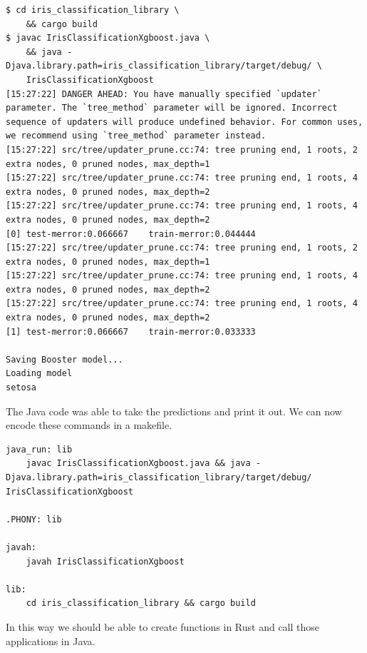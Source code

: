 \documentclass{book}
\begin{document}
\begin{lstlisting}[caption={chapter8/iris\_classification\_xgboost/iris\_classification\_library/src/lib.rs}, basicstyle=\small]
$ cd iris_classification_library \
	&& cargo build
$ javac IrisClassificationXgboost.java \
	&& java -Djava.library.path=iris_classification_library/target/debug/ \
	IrisClassificationXgboost
[15:27:22] DANGER AHEAD: You have manually specified `updater` parameter. The `tree_method` parameter will be ignored. Incorrect sequence of updaters will produce undefined behavior. For common uses, we recommend using `tree_method` parameter instead.
[15:27:22] src/tree/updater_prune.cc:74: tree pruning end, 1 roots, 2 extra nodes, 0 pruned nodes, max_depth=1
[15:27:22] src/tree/updater_prune.cc:74: tree pruning end, 1 roots, 4 extra nodes, 0 pruned nodes, max_depth=2
[15:27:22] src/tree/updater_prune.cc:74: tree pruning end, 1 roots, 4 extra nodes, 0 pruned nodes, max_depth=2
[0]	test-merror:0.066667	train-merror:0.044444
[15:27:22] src/tree/updater_prune.cc:74: tree pruning end, 1 roots, 2 extra nodes, 0 pruned nodes, max_depth=1
[15:27:22] src/tree/updater_prune.cc:74: tree pruning end, 1 roots, 4 extra nodes, 0 pruned nodes, max_depth=2
[15:27:22] src/tree/updater_prune.cc:74: tree pruning end, 1 roots, 4 extra nodes, 0 pruned nodes, max_depth=2
[1]	test-merror:0.066667	train-merror:0.033333

Saving Booster model...
Loading model
setosa
\end{lstlisting}

The Java code was able to take the predictions and print it out. We can now encode these commands in a makefile.

\begin{lstlisting}[caption={chapter8/iris\_classification\_xgboost/Makefile}, basicstyle=\small]
java_run: lib
	javac IrisClassificationXgboost.java && java -Djava.library.path=iris_classification_library/target/debug/ IrisClassificationXgboost

.PHONY: lib

javah:
	javah IrisClassificationXgboost

lib:
	cd iris_classification_library && cargo build
\end{lstlisting}

In this way we should be able to create functions in Rust and call those applications in Java.

\label{sub:java}
\label{sec:rust_plugnplay}
\end{document}
